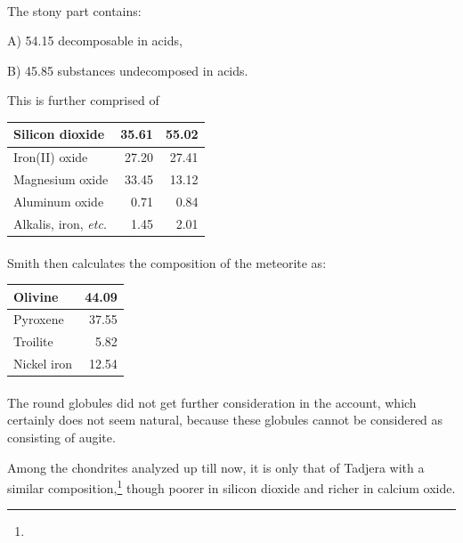 \documentclass[a4paper, 12pt, oneside]{article}
\begin{document}
\paragraph*{}
The stony part contains:

A) 54.15 decomposable in acids,

B) 45.85 substances undecomposed in acids.

This is further comprised of
\begin{center}
    \begin{tabular}{ |l|r|r| } 
    \hline
    Silicon dioxide & 35.61 & 55.02\\\hline
    Iron(II) oxide & 27.20 & 27.41\\\hline
    Magnesium oxide & 33.45 & 13.12\\\hline
    Aluminum oxide & 0.71 & 0.84\\\hline
    Alkalis, iron, \emph{etc}. & 1.45 & 2.01\\
    \hline
    \end{tabular}
\end{center}
\paragraph*{}
Smith then calculates the composition of the meteorite as:
\begin{center}
    \begin{tabular}{ |l|r| } 
    \hline
    Olivine & 44.09\\\hline
    Pyroxene & 37.55\\\hline
    Troilite & 5.82\\\hline
    Nickel iron & 12.54\\
    \hline
    \end{tabular}
\end{center}
\paragraph*{}
The round globules did not get further consideration in the account, which certainly does not seem natural, because these globules cannot be considered as consisting of augite.

Among the chondrites analyzed up till now, it is only that of Tadjera with a similar composition,\footnote{} though poorer in silicon dioxide and richer in calcium oxide.
\end{document}
